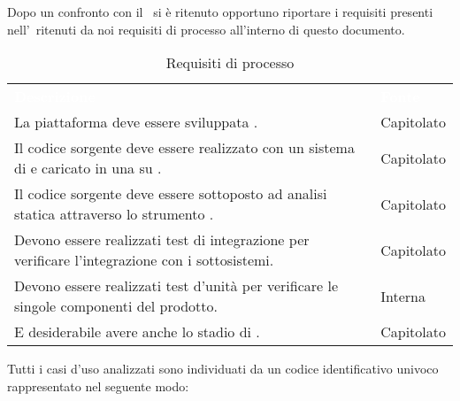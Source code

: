 \label{RequisitiProcesso}Dopo un confronto con il \VT\ si è ritenuto opportuno riportare i requisiti presenti nell'\AdR\ ritenuti da noi requisiti di processo all'interno di questo documento.  \\
\begin{table}[h]
	\centering
	\caption{Requisiti di processo} 
\renewcommand{\arraystretch}{1.5}
\begin{tabular}{|C{9.5cm} C{2.5cm}|} 
	
	\textcolor{white}{\textbf{Descrizione}}&
	\textcolor{white}{\textbf{Fonte}}\\	

	La piattaforma deve essere sviluppata . & Capitolato \\
	Il codice sorgente deve essere realizzato con un sistema di  e caricato in una  su . & Capitolato\\
	Il codice sorgente deve essere sottoposto ad analisi statica attraverso lo strumento . & Capitolato \\
	Devono essere realizzati test di integrazione per verificare l’integrazione con i sottosistemi. & Capitolato \\
	Devono essere realizzati test d’unità per verificare le singole componenti del prodotto. & Interna \\
	E desiderabile avere anche lo stadio di . & Capitolato \\
	\hline
\end{tabular}
\end{table}

Tutti i casi d'uso analizzati sono individuati da un codice identificativo univoco rappresentato nel seguente modo:

